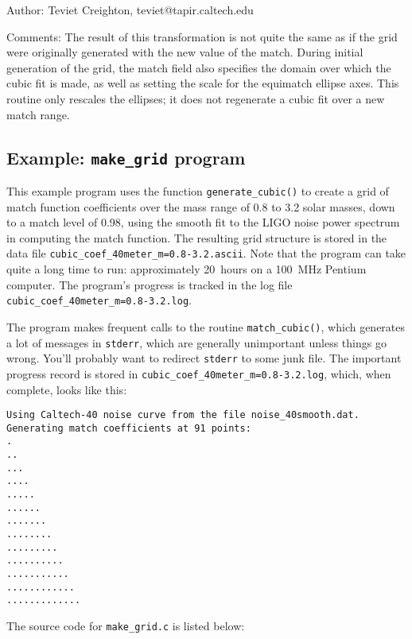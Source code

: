 \begin{description}
\item{Author:}
  Teviet Creighton, teviet@tapir.caltech.edu
\item{Comments:}
  The result of this transformation is not quite the same as if the
  grid were originally generated with the new value of the match.
  During initial generation of the grid, the match field also
  specifies the domain over which the cubic fit is made, as well as
  setting the scale for the equimatch ellipse axes.  This routine only
  rescales the ellipses; it does not regenerate a cubic fit over a new
  match range.
\end{description}


\clearpage
\subsection{Example: {\tt make\_grid} program}
\label{ss:make_grid}

This example program uses the function {\tt generate\_cubic()} to
create a grid of match function coefficients over the mass range of
0.8 to 3.2 solar masses, down to a match level of 0.98, using the
smooth fit to the LIGO noise power spectrum in computing the match
function.  The resulting grid structure is stored in the data file
{\tt cubic\_coef\_40meter\_m=0.8-3.2.ascii}.  Note that the program
can take quite a long time to run: approximately 20~hours on a 100~MHz
Pentium computer.  The program's progress is tracked in the log file
{\tt cubic\_coef\_40meter\_m=0.8-3.2.log}.

The program makes frequent calls to the routine {\tt match\_cubic()},
which generates a lot of messages in {\tt stderr}, which are generally
unimportant unless things go wrong.  You'll probably want to redirect
{\tt stderr} to some junk file.  The important progress record is
stored in {\tt cubic\_coef\_40meter\_m=0.8-3.2.log}, which, when
complete, looks like this:

\begin{verbatim}
Using Caltech-40 noise curve from the file noise_40smooth.dat.
Generating match coefficients at 91 points:
.
..
...
....
.....
......
.......
........
.........
..........
...........
............
.............

\end{verbatim}

The source code for {\tt make\_grid.c} is listed below:


